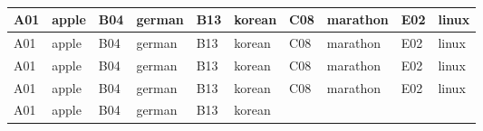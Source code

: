 \begin{center}
~
\large
\begin{tcolorbox}[colback=white, colframe=myYellow, title={$\vcenter{\hbox{\texttt{[image: minus.png]}}}$
\textcolor{white}{\bfseries These items can be both good and bad choices at this moment, pleas hold on.}}]

\begin{tabularx}{\textwidth}{XXXXXXXXXX}
 \hline
 A01&apple&B04&german&B13&korean&C08&marathon&E02&linux\\
 \hline
 A01&apple&B04&german&B13&korean&C08&marathon&E02&linux\\
 \hline
 A01&apple&B04&german&B13&korean&C08&marathon&E02&linux\\
 \hline
 A01&apple&B04&german&B13&korean&C08&marathon&E02&linux\\
 \hline
 A01&apple&B04&german&B13&korean\\
 \hline
\end{tabularx}
\end{tcolorbox}
\end{center}

